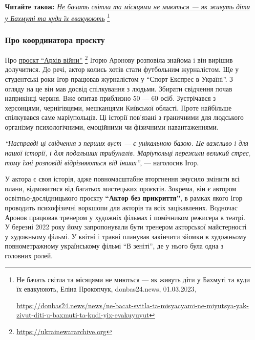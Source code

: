 \textbf{Читайте також:} \href{https://donbas24.news/news/ne-bacat-svitla-ta-misyacyami-ne-miyutsya-yak-zivut-diti-u-baxmuti-ta-kudi-yix-evakuyuyut}{\emph{Не бачать світла та місяцями не миються — як живуть діти у Бахмуті та куди їх евакуюють}}%
\footnote{Не бачать світла та місяцями не миються — як живуть діти у Бахмуті та куди їх евакуюють, Еліна Прокопчук, donbas24.news, 01.03.2023, \par%
\url{https://donbas24.news/news/ne-bacat-svitla-ta-misyacyami-ne-miyutsya-yak-zivut-diti-u-baxmuti-ta-kudi-yix-evakuyuyut}%
}

\subsubsection{Про координатора проєкту}

Про \href{https://ukrainewararchive.org}{проєкт \enquote{Архів війни}}%
\footnote{\url{https://ukrainewararchive.org}}
Ігорю Аронову розповіла знайома і він вирішив
долучитися. До речі, актор колись хотів стати футбольним журналістом. Ще у
студентські роки Ігор працював журналістом у \enquote{Спорт-Експрес в Україні}. З
огляду на це він мав досвід спілкування з людьми. Збирати свідчення почав
наприкінці червня. Вже опитав приблизно 50 — 60 осіб. Зустрічався з херсонцями,
чернігівцями, мешканцями Київської області. Проте найбільше спілкувався саме
маріупольців. Ці історії пов'язані з граничними для людського організму
психологічними, емоційними чи фізичними навантаженнями.


\begin{leftbar}
\emph{\enquote{Насправді ці свідчення з перших вуст — є унікальною базою. Це важливо і для
нашої історії, і для подальших трибуналів. Маріупольці пережили великий стрес,
тому їхні розповіді відрізняються від інших}}, — наголосив Ігор.
\end{leftbar}

У актора є своя історія, адже повномасштабне вторгнення змусило змінити всі
плани, відмовитися від багатьох мистецьких проєктів. Зокрема, він є автором
освітньо-дослідницького проєкту \textbf{\enquote{Актор без прикриття}}, в рамках якого Ігор
проводить психофізичні воркшопи для акторів та всіх зацікавлених. Водночас
Аронов працював тренером у художніх фільмах і помічником режисера в театрі. У
березні 2022 року йому запропонували бути тренером акторської майстерності у
художньому фільмі. У квітні і травні планував закінчити зйомки в художньому
повнометражному українському фільмі \enquote{В зеніті}, де у нього була одна з головних
ролей.

